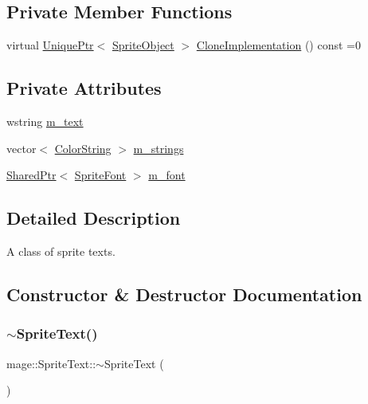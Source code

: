 \subsection*{Private Member Functions}
\begin{DoxyCompactItemize}
\item 
virtual \hyperlink{namespacemage_a3316d7143a973e37adf1110f2e80ca31}{Unique\+Ptr}$<$ \hyperlink{classmage_1_1_sprite_object}{Sprite\+Object} $>$ \hyperlink{classmage_1_1_sprite_text_a2b9f59a1730f8b9691f173251a2b4944}{Clone\+Implementation} () const =0
\end{DoxyCompactItemize}
\subsection*{Private Attributes}
\begin{DoxyCompactItemize}
\item 
wstring \hyperlink{classmage_1_1_sprite_text_a807d5dc467ef16f6c83762dfe6ad3391}{m\+\_\+text}
\item 
vector$<$ \hyperlink{structmage_1_1_color_string}{Color\+String} $>$ \hyperlink{classmage_1_1_sprite_text_ab528f96257fd7e690be765241b2d76f7}{m\+\_\+strings}
\item 
\hyperlink{namespacemage_a1e01ae66713838a7a67d30e44c67703e}{Shared\+Ptr}$<$ \hyperlink{classmage_1_1_sprite_font}{Sprite\+Font} $>$ \hyperlink{classmage_1_1_sprite_text_a922e37fbcbc431e815ebabe82e4528b0}{m\+\_\+font}
\end{DoxyCompactItemize}


\subsection{Detailed Description}
A class of sprite texts. 

\subsection{Constructor \& Destructor Documentation}
\hypertarget{classmage_1_1_sprite_text_aa30d68a79775dce902c190f2cd298bb4}{}\label{classmage_1_1_sprite_text_aa30d68a79775dce902c190f2cd298bb4} 
\subsubsection{\texorpdfstring{$\sim$\+Sprite\+Text()}{~SpriteText()}}
{\footnotesize\ttfamily mage\+::\+Sprite\+Text\+::$\sim$\+Sprite\+Text (\begin{DoxyParamCaption}{ }\end{DoxyParamCaption})\hspace{0.3cm}{\ttfamily [virtual]}}

